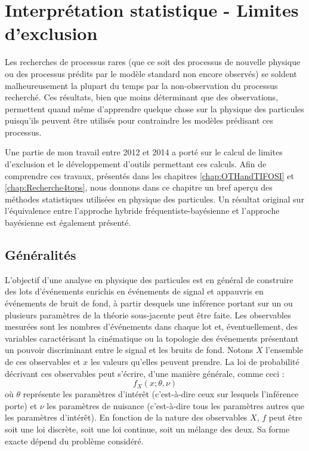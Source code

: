 \chapter{Interprétation statistique - Limites d'exclusion}
\label{chap:interpretationStatLimit}

Les recherches de processus rares (que ce soit des processus de nouvelle physique ou des processus pr\'edits par le mod\`ele standard non encore observ\'es) se soldent malheureusement la plupart du temps par la non-observation du processus recherché. Ces r\'esultats, bien que moins d\'eterminant que des observations, permettent quand m\^eme d'apprendre quelque chose sur la physique des particules puisqu'ils peuvent \^etre utilis\'es pour contraindre les mod\`eles pr\'edisant ces processus. 

Une partie de mon travail entre 2012 et 2014 a porté sur le calcul de limites d'exclusion et le développement d'outils permettant ces calculs. 
Afin de comprendre ces travaux, pr\'esent\'es dans les chapitres \ref{chap:OTHandTIFOSI} et \ref{chap:Recherche4tops}, nous donnons dans ce chapitre un bref aper\c cu des m\'ethodes statistiques utilis\'ees en physique des particules. 
Un r\'esultat original sur l'\'equivalence entre l'approche hybride fr\'equentiste-bay\'esienne et l'approche bay\'esienne est \'egalement pr\'esent\'e. 


\section{Généralités}
\label{sec:GeneraliteStat}

L'objectif d'une analyse en physique des particules est en général de construire des lots d'événements enrichis en événements de signal et appauvris en événements de bruit de fond, à partir desquels une inférence portant sur un ou plusieurs paramètres de la théorie sous-jacente peut être faite. Les observables mesurées sont les nombres d'événements dans chaque lot et, éventuellement, des variables caractérisant la cinématique ou la topologie des événements présentant un pouvoir discriminant entre le signal et les bruits de fond. Notons $X$ l'ensemble de ces observables et $x$ les valeurs qu'elles peuvent prendre. La loi de probabilité décrivant ces observables peut s'écrire, d'une manière générale, comme ceci :
\begin{equation}
\label{eq:loiProbaGenerale}
f_X(x;\theta,\nu)
\end{equation}
où $\theta$ représente les paramètres d'intérêt (c'est-à-dire ceux sur lesquels l'inférence porte) et $\nu$ les paramètres de nuisance (c'est-\`a-dire tous les param\`etres autres que les param\`etres d'int\'er\^et). En fonction de la nature des observables $X$, $f$ peut être soit une loi discrète, soit une loi continue, soit un mélange des deux. Sa forme exacte dépend du problème considéré.

